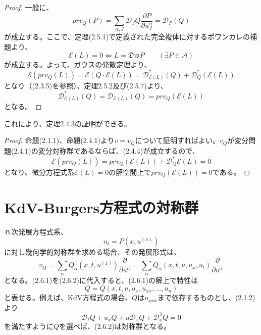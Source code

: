 \documentclass[a4paper, 11pt]{report}
\theoremstyle{definition}
\begin{document}
\begin{proof}
 一般に、
\begin{equation}
prv_Q(P) = \sum_{\alpha ,J}\mathcal{D}_J Q \frac{\partial P}{\partial u^{\alpha}_J} = \mathcal{D}_P (Q)  %
\end{equation}
が成立する。ここで、定理(2.5.1)で定義された完全複体に対するポワンカレの補題より、
\begin{equation}
\mathcal{E}(L) = 0 \Leftrightarrow L = \mathfrak{Div}P \qquad (\exists P\in \mathcal{A})  %
\end{equation}
が成立する。よって、ガウスの発散定理より、
\begin{equation*}
\mathcal{E}(prv_Q(L)) = \mathcal{E}(Q \cdot \mathcal{E}(L)) = \mathcal{D}_{\mathcal{E}(L)}^*(Q) + \mathcal{D}_{Q}^*(\mathcal{E}(L))
\end{equation*}
となり（(2.3.5)を参照）、定理2.5.2及び(2.5.7)より、
\begin{equation*}
\mathcal{D}_{\mathcal{E}(L)}^*(Q) = \mathcal{D}_{\mathcal{E}(L)}(Q) = prv_Q(\mathcal{E}(L))
\end{equation*}
となる。
\end{proof}

 これにより、定理2.4.3の証明ができる。

\begin{proof}
 命題(2.1.1)、命題(2.4.1)より$v=v_Q$について証明すればよい。$v_Q$が変分問題(2.4.1)の変分対称群であるならば、(2.4.4)が成立するので、
\begin{equation*}
\mathcal{E}(prv_Q(L)) = prv_Q(\mathcal{E}(L)) + \mathcal{D}_{Q}^*\mathcal{E}(L) = 0
\end{equation*}
となり、微分方程式系$\mathcal{E}(L)=0$の解空間上で$prv_Q(\mathcal{E}(L))=0$である。
\end{proof}

\section{KdV-Burgers方程式の対称群}

 ｎ次発展方程式系、
\begin{equation}
u_t = P(x, u^{(n)})  %
\end{equation}
に対し幾何学的対称群を求める場合、その発展形式は、
\begin{equation}
v_Q = \sum_{\alpha}Q_{\alpha}(x, t, u^{(1)})\frac{\partial}{\partial u^{\alpha}} = \sum_{\alpha}Q_{\alpha}(x, t, u, u_x, u_t)\frac{\partial}{\partial u^{\alpha}}  %
\end{equation}
となる。(2.6.1)を(2.6.2)に代入すると、(2.6.1)の解上で特性は
\begin{equation*}
Q = Q(x, t, u, u_x, u_{xx}, \dots , u_n)
\end{equation*}
と表せる。例えば、KdV方程式の場合、$Q$は$u_{xxx}$まで依存するものとし、(2.1.2)より
\begin{equation}
\mathcal{D}_tQ + u_xQ + u\mathcal{D}_xQ + \mathcal{D}_{x}^3Q  = 0  %
\end{equation}
を満たすように$Q$を選べば、(2.6.2)は対称群となる。\\
\end{document}
